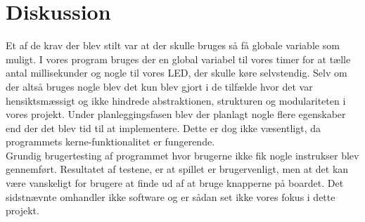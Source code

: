 \section{Diskussion}
Et af de krav der blev stilt var at der skulle bruges så få globale variable som muligt. I vores program bruges der en global variabel til vores timer for at tælle antal millisekunder og nogle til vores LED, der skulle køre selvstendig. Selv om der altså bruges nogle blev det kun blev gjort i de tilfælde hvor det var hensiktsmæssigt og ikke hindrede abstraktionen, strukturen og modulariteten i vores projekt.
Under planleggingsfasen blev der planlagt nogle flere egenskaber end der det blev tid til at implementere. Dette er dog ikke væsentligt, da programmets kerne-funktionalitet er fungerende.\\
Grundig brugertesting af programmet hvor brugerne ikke fik nogle instrukser blev gennemført. Resultatet af testene, er at spillet er brugervenligt, men at det kan være vanskeligt for brugere at finde ud af at bruge knapperne på boardet. Det sidstnævnte omhandler ikke software og er sådan set ikke vores fokus i dette projekt.